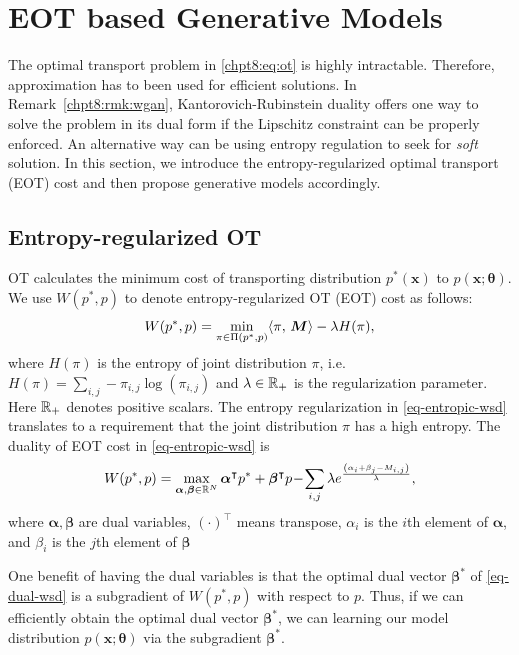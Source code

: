 \section{EOT based Generative Models}

The optimal transport problem in \eqref{chpt8:eq:ot} is highly intractable. Therefore, approximation has to been used for efficient solutions. In Remark~\ref{chpt8:rmk:wgan}, Kantorovich-Rubinstein duality offers one way to solve the problem in its dual form if the Lipschitz constraint can be properly enforced. An alternative way can be using entropy regulation to seek for \textit{soft} solution.  In this section, we introduce the entropy-regularized optimal transport (EOT) cost and then propose generative models accordingly.

\subsection{Entropy-regularized OT} 

OT calculates the minimum cost of transporting distribution $p^{\ast}(\bm{x})$ to $p(\bm{x}; \bm{\theta})$. We use $W(p^{\ast},p)$ to denote entropy-regularized OT (EOT) cost as follows:
\begin{equation}\label{eq-entropic-wsd}
  W(p^{\ast},p)=\min_{ \pi \in \Pi(p^{\ast}, p)} \langle \pi,\,\bm{M}\rangle - \lambda H(\pi),
\end{equation}
where $H(\pi)$ is the entropy of joint distribution $\pi$, i.e. $H(\pi) = \sum_{i,j} -\pi_{i,j}
\log(\pi_{i,j})$ and $\lambda \in \mathbb{R}_{+}$ is the regularization
parameter. Here $\mathbb{R}_{+}$ denotes positive scalars. The entropy regularization in \eqref{eq-entropic-wsd}  translates 
to a requirement that the joint distribution $\pi$ has a high entropy. 
 The duality of EOT cost in \eqref{eq-entropic-wsd} is
\begin{equation}\label{eq-dual-wsd}
  W(p^{\ast}, p)  =  \max_{\bm{\al}, \bm{\be} \in \mathbb{R}^{N}} \bm{\al}^{\intercal}p^{\ast} + \bm{\beta}^{\intercal}p \! - \!
  \sum_{i,j} \lambda e^{ \frac{{\left( \al_i + \beta_j - M_{i,j} \right)}}{\la} },\vspace{-2pt}
\end{equation}
where $\bm{\alpha},\bm{\beta}$ are dual variables, $(\cdot)^{\intercal}$ means transpose, $\alpha_i$ is the $i$th element of $\bm{\alpha}$, and $\beta_i$ is the $j$th element of $\bm{\beta}$

One benefit of having the dual variables is that the optimal dual vector $\bm{\beta}^{\ast}$
of \eqref{eq-dual-wsd} is a subgradient of $W(p^{\ast},p)$ with respect to $p$. Thus, if we can efficiently obtain the optimal dual vector $\bm{\beta}^{\ast}$, we can learning our model distribution $p(\bm{x}; \bm{\theta})$ via the subgradient $\bm{\beta}^{\ast}$.

